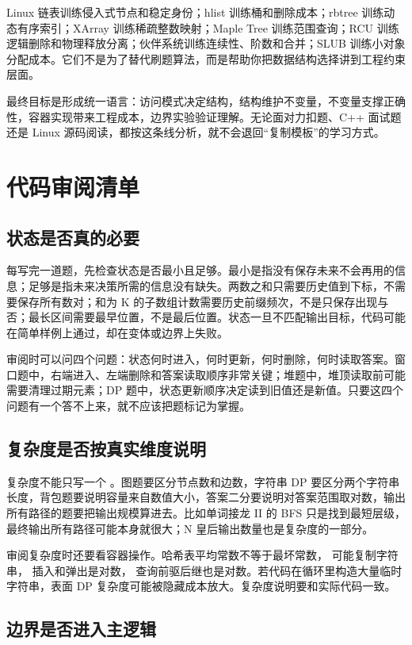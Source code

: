 Linux 链表训练侵入式节点和稳定身份；hlist 训练桶和删除成本；rbtree 训练动态有序索引；XArray 训练稀疏整数映射；Maple Tree 训练范围查询；RCU 训练逻辑删除和物理释放分离；伙伴系统训练连续性、阶数和合并；SLUB 训练小对象分配成本。它们不是为了替代刷题算法，而是帮助你把数据结构选择讲到工程约束层面。

最终目标是形成统一语言：访问模式决定结构，结构维护不变量，不变量支撑正确性，容器实现带来工程成本，边界实验验证理解。无论面对力扣题、C++ 面试题还是 Linux 源码阅读，都按这条线分析，就不会退回“复制模板”的学习方式。

\section{代码审阅清单}

\subsection{状态是否真的必要}

每写完一道题，先检查状态是否最小且足够。最小是指没有保存未来不会再用的信息；足够是指未来决策所需的信息没有缺失。两数之和只需要历史值到下标，不需要保存所有数对；和为 K 的子数组计数需要历史前缀频次，不是只保存出现与否；最长区间需要最早位置，不是最后位置。状态一旦不匹配输出目标，代码可能在简单样例上通过，却在变体或边界上失败。

审阅时可以问四个问题：状态何时进入，何时更新，何时删除，何时读取答案。窗口题中，右端进入、左端删除和答案读取顺序非常关键；堆题中，堆顶读取前可能需要清理过期元素；DP 题中，状态更新顺序决定读到旧值还是新值。只要这四个问题有一个答不上来，就不应该把题标记为掌握。

\subsection{复杂度是否按真实维度说明}

复杂度不能只写一个 。图题要区分节点数和边数，字符串 DP 要区分两个字符串长度，背包题要说明容量来自数值大小，答案二分要说明对答案范围取对数，输出所有路径的题要把输出规模算进去。比如单词接龙 II 的 BFS 只是找到最短层级，最终输出所有路径可能本身就很大；N 皇后输出数量也是复杂度的一部分。

审阅复杂度时还要看容器操作。哈希表平均常数不等于最坏常数， 可能复制字符串， 插入和弹出是对数， 查询前驱后继也是对数。若代码在循环里构造大量临时字符串，表面 DP 复杂度可能被隐藏成本放大。复杂度说明要和实际代码一致。

\subsection{边界是否进入主逻辑}

